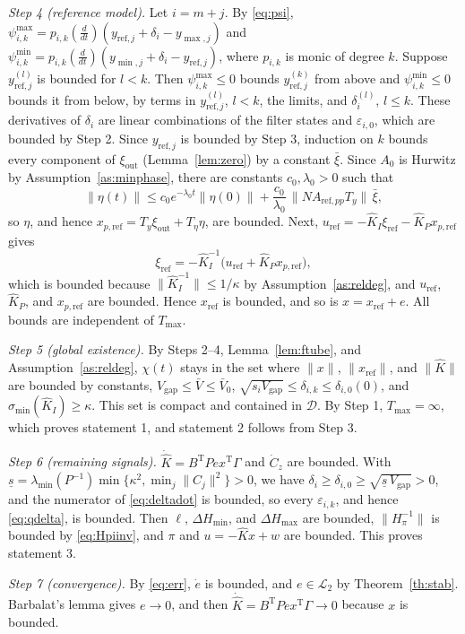 \documentclass[lettersize,journal]{IEEEtran}
\newcommand{\Kh}{\hat{K}}
\newcommand{\Khd}{\dot{\hat{K}}}
\newcommand{\xr}{x_{\mathrm{ref}}}
\newcommand{\xpr}{x_{p,\mathrm{ref}}}
\newcommand{\App}{A_{\mathrm{ref},pp}}
\newcommand{\uref}{u_{\mathrm{ref}}}
\newcommand{\Vb}{\bar{V}}
\newcommand{\Vg}{V_{\mathrm{gap}}}
\newcommand{\T}{\mathrm{T}}
\begin{document}
\begin{IEEEproof}
\emph{Step 4 (reference model).} Let $i=m+j$. By \eqref{eq:psi}, $\psi^{\max}_{i,k}=p_{i,k}(\frac{d}{dt})(y_{\mathrm{ref},j}+\delta_i-y_{\max,j})$ and $\psi^{\min}_{i,k}=p_{i,k}(\frac{d}{dt})(y_{\min,j}+\delta_i-y_{\mathrm{ref},j})$, where $p_{i,k}$ is monic of degree $k$. Suppose $y^{(l)}_{\mathrm{ref},j}$ is bounded for $l<k$. Then $\psi^{\max}_{i,k}\le0$ bounds $y^{(k)}_{\mathrm{ref},j}$ from above and $\psi^{\min}_{i,k}\le0$ bounds it from below, by terms in $y^{(l)}_{\mathrm{ref},j}$, $l<k$, the limits, and $\delta_i^{(l)}$, $l\le k$. These derivatives of $\delta_i$ are linear combinations of the filter states and $\varepsilon_{i,0}$, which are bounded by Step 2. Since $y_{\mathrm{ref},j}$ is bounded by Step 3, induction on $k$ bounds every component of $\xi_{\mathrm{out}}$ (Lemma~\ref{lem:zero}) by a constant $\bar\xi$. Since $A_0$ is Hurwitz by Assumption~\ref{as:minphase}, there are constants $c_0,\lambda_0>0$ such that
\begin{equation*}
\|\eta(t)\|\le c_0e^{-\lambda_0t}\|\eta(0)\| + \frac{c_0}{\lambda_0}\,\|N\App T_y\|\,\bar\xi,
\end{equation*}
so $\eta$, and hence $\xpr=T_y\xi_{\mathrm{out}}+T_\eta\eta$, are bounded. Next, $\uref=-\Kh_I\xi_{\mathrm{ref}}-\Kh_P\xpr$ gives
\begin{equation*}
\xi_{\mathrm{ref}} = -\Kh_I^{-1}\big(\uref+\Kh_P\xpr\big),
\end{equation*}
which is bounded because $\|\Kh_I^{-1}\|\le1/\kappa$ by Assumption~\ref{as:reldeg}, and $\uref$, $\Kh_P$, and $\xpr$ are bounded. Hence $\xr$ is bounded, and so is $x=\xr+e$. All bounds are independent of $T_{\max}$.

\emph{Step 5 (global existence).} By Steps 2--4, Lemma~\ref{lem:ftube}, and Assumption~\ref{as:reldeg}, $\chi(t)$ stays in the set where $\|x\|$, $\|\xr\|$, and $\|\Kh\|$ are bounded by constants, $\Vg\le\Vb\le\Vb_0$, $\sqrt{s_i\Vg}\le\delta_{i,k}\le\delta_{i,0}(0)$, and $\sigma_{\min}(\Kh_I)\ge\kappa$. This set is compact and contained in $\mathcal{D}$. By Step 1, $T_{\max}=\infty$, which proves statement 1, and statement 2 follows from Step 3.

\emph{Step 6 (remaining signals).} $\Khd=B^\T Pex^\T\Gamma$ and $\dot C_z$ are bounded. With $\underline{s}=\lambda_{\min}(P^{-1})\min\{\kappa^2,\min_j\|C_j\|^2\}>0$, we have $\delta_i\ge\delta_{i,0}\ge\sqrt{\underline{s}\,\Vg}>0$, and the numerator of \eqref{eq:deltadot} is bounded, so every $\varepsilon_{i,k}$, and hence \eqref{eq:qdelta}, is bounded. Then $\ell$, $\Delta H_{\min}$, and $\Delta H_{\max}$ are bounded, $\|H_\pi^{-1}\|$ is bounded by \eqref{eq:Hpiinv}, and $\pi$ and $u=-\Kh x+w$ are bounded. This proves statement 3.

\emph{Step 7 (convergence).} By \eqref{eq:err}, $\dot e$ is bounded, and $e\in\mathcal{L}_2$ by Theorem~\ref{th:stab}. Barbalat's lemma \cite[Lemma~8.2]{khalil2002} gives $e\to0$, and then $\Khd=B^\T Pex^\T\Gamma\to0$ because $x$ is bounded.
\end{IEEEproof}
\end{document}
